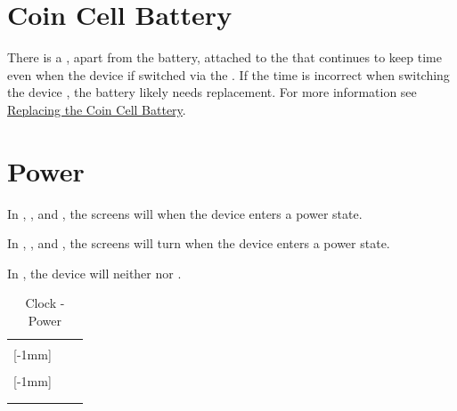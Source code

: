 \section{Coin Cell Battery}

There is a  \hyperref[Coin Cell Battery]{}, apart from the
 battery, attached to the  that continues to keep time even when
the device if switched  via the .  If the time is incorrect when
switching the device , the battery likely needs replacement.  For more
information see \hyperref[Replacing Battery]{Replacing the Coin Cell Battery}.

\section{Power}

In , ,  and , the screens will  when
the device enters a  power state.

\par\medskip

In , ,  and , the screens will turn 
when the device enters a  power state.

\par\medskip

In , the device will neither  nor .

\begin{table}[H]
  \begin{tabu}{ X[1,c,m] | X[1,c,m] | X[1,c,m] }
  \thrule
   &  &  \\ \mrule

  [-1mm]{} 
    &    \newline {}
    &  \\ 
  &  &  \\ \mrule

  [-1mm]{} 
    &    \newline {}
    &  \\ 
  &  &  \\

  \bhrule
  \end{tabu}
\caption {Clock - Power}
\end{table}

